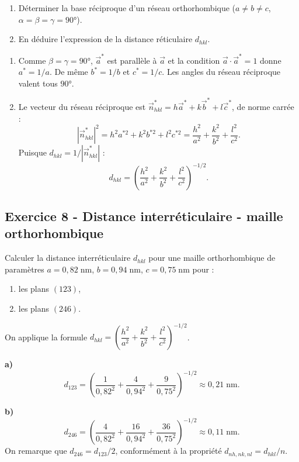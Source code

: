 \documentclass[12pt,a4paper]{article}
\begin{document}
\begin{boiteexercice}
\niveau{\moyen}
\begin{enumerate}
  \item Déterminer la base réciproque d'un réseau orthorhombique ($a\neq b\neq c$, $\alpha=\beta=\gamma=90°$).
  \item En déduire l'expression de la distance réticulaire $d_{hkl}$.
\end{enumerate}
\end{boiteexercice}

\begin{boitecorrige}
\begin{enumerate}
\item Comme $\beta=\gamma=90°$, $\vec{a}^*$ est parallèle à $\vec{a}$ et la condition $\vec{a}\cdot\vec{a}^*=1$ donne $a^*=1/a$. De même $b^*=1/b$ et $c^*=1/c$. Les angles du réseau réciproque valent tous $90°$.

\item Le vecteur du réseau réciproque est $\vec{n}_{hkl}^* = h\vec{a}^*+k\vec{b}^*+l\vec{c}^*$, de norme carrée :
\[
|\vec{n}_{hkl}^*|^2 = h^2a^{*2}+k^2b^{*2}+l^2c^{*2} = \frac{h^2}{a^2}+\frac{k^2}{b^2}+\frac{l^2}{c^2}.
\]
Puisque $d_{hkl}=1/|\vec{n}_{hkl}^*|$ :
\[
\boxed{d_{hkl} = \left(\frac{h^2}{a^2}+\frac{k^2}{b^2}+\frac{l^2}{c^2}\right)^{-1/2}.}
\]
\end{enumerate}
\end{boitecorrige}

\subsection*{Exercice 8 - Distance interréticulaire - maille orthorhombique \niveau{\facile}}

\begin{boiteexercice}
\niveau{\facile}
Calculer la distance interréticulaire $d_{hkl}$ pour une maille orthorhombique de paramètres $a=0{,}82\;\text{nm}$, $b=0{,}94\;\text{nm}$, $c=0{,}75\;\text{nm}$ pour :
\begin{enumerate}[label=\alph*)]
  \item les plans $(123)$,
  \item les plans $(246)$.
\end{enumerate}
\end{boiteexercice}

\begin{boitecorrige}
On applique la formule $d_{hkl} = \left(\dfrac{h^2}{a^2}+\dfrac{k^2}{b^2}+\dfrac{l^2}{c^2}\right)^{-1/2}$.

\textbf{a)}
\[
d_{123} = \left(\frac{1}{0{,}82^2}+\frac{4}{0{,}94^2}+\frac{9}{0{,}75^2}\right)^{-1/2} \approx 0{,}21\;\text{nm.}
\]

\textbf{b)}
\[
d_{246} = \left(\frac{4}{0{,}82^2}+\frac{16}{0{,}94^2}+\frac{36}{0{,}75^2}\right)^{-1/2} \approx 0{,}11\;\text{nm.}
\]
On remarque que $d_{246} = d_{123}/2$, conformément à la propriété $d_{nh,nk,nl} = d_{hkl}/n$.
\end{boitecorrige}
\end{document}
